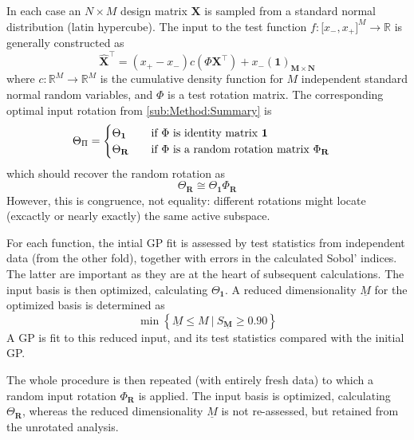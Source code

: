 \documentclass[preprint,12pt]{elsarticle}
\newcommand*{\M}[1]{\ensuremath{#1}\xspace}
\newcommand*{\vr}[1]{\M{\mathbf{#1}}}
\newcommand*{\st}[1]{\M{\mathbb{#1}}}
\newcommand{\T}[1]{\text{#1}}
\newcommand*{\QT}[2][]{\M{\quad\T{#2}\ifthenelse{\equal{#1}{}}{\quad}{#1}}}
\newcommand*{\setbuilder}[2]{\M{\left\lbrace#1 \: \big\vert \: #2\right\rbrace}}
\begin{document}
        In each case an \M{N \times M} design matrix \vr{X} is sampled from a standard normal distribution (latin hypercube). 
        The input to the test function \M{f\colon \lbrack x_-, x_+ \rbrack^{M} \to \st{R}} is generally constructed as
        \begin{equation} \label{def:Xhat}
            \vr{\hat{X}}^{\intercal} = (x_+ - x_-) c(\Phi \vr{X}^{\intercal}) + x_-(\vr{1})_{\vr{M} \times \vr{N}}
        \end{equation}
        where \M{c\colon \st{R}^M\to\st{R}^M} is the cumulative density function for \M{M} independent standard normal random variables, and \M{\Phi} is a test rotation matrix. 
        The corresponding optimal input rotation from \cref{sub:Method:Summary} is
        \begin{equation}
            \Theta_{\Pi} = \begin{cases}
                \Theta_{\vr{1}} & \QT{if \M{\Phi} is identity matrix \M{\vr{1}}} \\
                \Theta_{\vr{R}} & \QT{if \M{\Phi} is a random rotation matrix \M{\Phi_{\vr{R}}}}
            \end{cases}
        \end{equation}
        which should recover the random rotation as
        \begin{equation}
            \Theta_{\vr{R}} \cong \Theta_{\vr{1}} \Phi_{\vr{R}}
        \end{equation}
        However, this is congruence, not equality: different rotations might locate (excactly or nearly exactly) the same active subspace.

        For each function, the intial GP fit is assessed by test statistics from independent data (from the other fold), together with errors in the calculated Sobol' indices. The latter are important as they are at the heart of subsequent calculations. The input basis is then optimized, calculating $\Theta_{\vr{1}}$.
        A reduced dimensionality \M{\underline{M}} for the optimized basis is determined as 
        \begin{equation} \label{eq:Results:Mbar}
            \min \setbuilder{\underline{M} \leq M}{S_{\underline{\vr{M}}} \geq 0.90}
        \end{equation}
        A GP is fit to this reduced input, and its test statistics compared with the initial GP.

        The whole procedure is then repeated (with entirely fresh data) to which a random input rotation $\Phi_{\vr{R}}$ is applied. The input basis is optimized, calculating $\Theta_{\vr{R}}$, whereas the reduced dimensionality \M{\underline{M}} is not re-assessed, but retained from the unrotated analysis.
\end{document}
